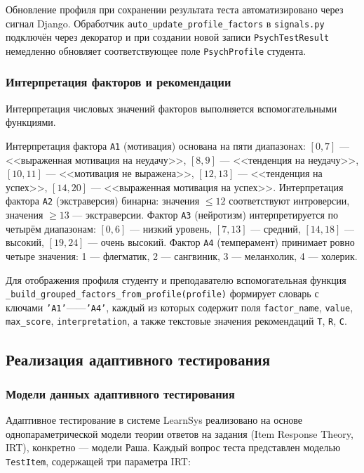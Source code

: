 Обновление профиля при сохранении результата теста автоматизировано 
через сигнал Django. Обработчик \texttt{auto\_update\_profile\_factors} 
в \texttt{signals.py} подключён через декоратор и при создании 
новой записи \texttt{PsychTestResult} немедленно обновляет 
соответствующее поле \texttt{PsychProfile} студента.

\subsubsection{Интерпретация факторов и рекомендации}

Интерпретация числовых значений факторов выполняется вспомогательными 
функциями.

Интерпретация фактора \texttt{A1} (мотивация) основана на пяти 
диапазонах: $[0, 7]$ --- <<выраженная мотивация на неудачу>>, $[8, 9]$ --- 
<<тенденция на неудачу>>, $[10, 11]$ --- <<мотивация не выражена>>, 
$[12, 13]$ --- <<тенденция на успех>>, $[14, 20]$ --- <<выраженная 
мотивация на успех>>. Интерпретация фактора \texttt{A2} (экстраверсия) 
бинарна: значения $\leq 12$ соответствуют интроверсии, значения 
$\geq 13$ --- экстраверсии. Фактор \texttt{A3} (нейротизм) интерпретируется 
по четырём диапазонам: $[0, 6]$ --- низкий уровень, $[7, 13]$ --- средний, 
$[14, 18]$ --- высокий, $[19, 24]$ --- очень высокий. Фактор \texttt{A4} 
(темперамент) принимает ровно четыре значения: 1 --- флегматик, 
2 --- сангвиник, 3 --- меланхолик, 4 --- холерик.

Для отображения профиля студенту и преподавателю вспомогательная 
функция \texttt{\_build\_grouped\_factors\_from\_profile(profile)} 
формирует словарь с ключами \texttt{'A1'}------\texttt{'A4'}, каждый из 
которых содержит поля \texttt{factor\_name}, \texttt{value}, 
\texttt{max\_score}, \texttt{interpretation}, а также текстовые 
значения рекомендаций \texttt{T}, \texttt{R}, \texttt{C}.

\subsection{Реализация адаптивного тестирования}
\label{subsec:adaptive_testing}

\subsubsection{Модели данных адаптивного тестирования}

Адаптивное тестирование в системе LearnSys реализовано на основе 
однопараметрической модели теории ответов на задания (Item Response 
Theory, IRT), конкретно --- модели Раша. Каждый вопрос теста 
представлен моделью \texttt{TestItem}, содержащей три параметра IRT:

